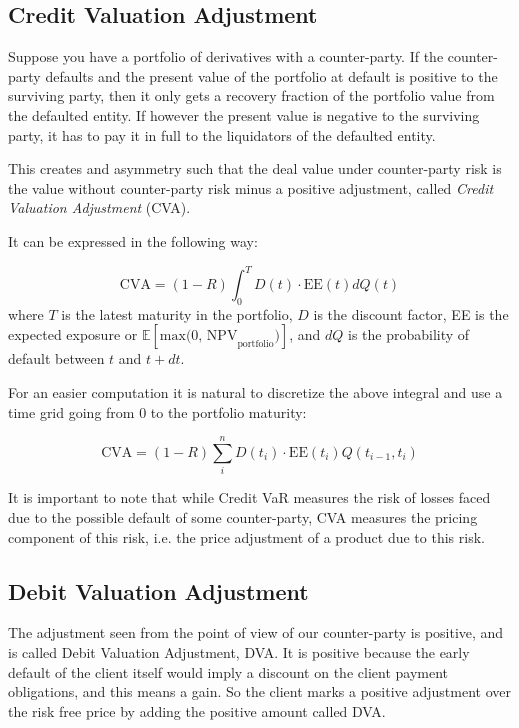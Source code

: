 \begin{codebox}
\section{Credit Valuation Adjustment}
\label{credit-valuation-adjustment}

Suppose you have a portfolio of derivatives with a counter-party. 
If the counter-party defaults and the present value of the portfolio at
default is positive to the surviving party, then it only
gets a recovery fraction of the portfolio value from the defaulted entity. 
If however the present value is negative to the surviving party,
it has to pay it in full to the liquidators of the defaulted entity.

This creates and asymmetry such that the deal value under counter-party risk is
the value without counter-party risk minus a positive adjustment, called
\emph{Credit Valuation Adjustment} (CVA).

It can be expressed in the following way:

\begin{equation}
\text{CVA} = (1-R) \int_0^T D(t) \cdot \textrm{EE}(t) dQ(t)
\label{eq:cva}
\end{equation}
where $T$ is the latest maturity in the portfolio, $D$ is the discount factor, EE is the expected exposure or \(\mathbb{E}[\text{max(0, NPV}_\text{portfolio})]\), and $dQ$ is the probability of default between $t$ and $t+dt$.

For an easier computation it is natural to discretize the above integral
and use a time grid going from 0 to the portfolio maturity:

\begin{equation}
\text{CVA} = (1-R) \sum_i^n D(t_i) \cdot \mathrm{EE}(t_i) Q(t_{i-1}, t_i)
\label{eq:cva_discrete}
\end{equation}

It is important to note that while Credit VaR measures the risk of losses faced due to the possible default of some counter-party, CVA measures the pricing component of this risk, i.e. the price adjustment of a product due to this risk.

\subsection{Debit Valuation Adjustment}

The adjustment seen from the point of view of our counter-party is positive, and is called Debit Valuation Adjustment, DVA. It is positive because the early default of the client itself would imply a discount on the client payment obligations, and this means a gain. So the client marks a positive adjustment over the risk free price by adding the positive amount called DVA. 


\end{codebox}
